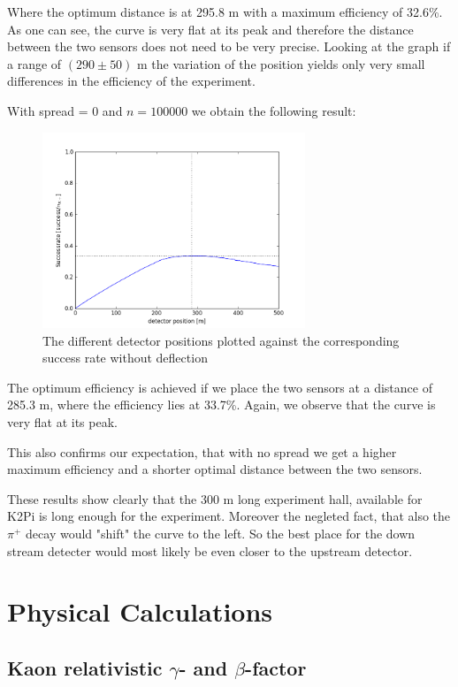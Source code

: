 \documentclass[a4paper,parskip,11pt, DIV12]{scrreprt}
\begin{document}
Where the optimum distance is at 295.8 m with a maximum efficiency of 32.6\%. As one can see, the curve is very flat at its peak and therefore the distance between the two sensors does not need to be very precise. Looking at the graph if a range of $(290 \pm 50)$ m the variation of the position yields only very small differences in the efficiency of the experiment.

With spread = 0 and $n = 100000$ we obtain the following result:

\begin{figure}[h] 
\centering
\includegraphics[width=0.7\textwidth]{Simulation100kNoSpread.png} 
\caption{The different detector positions plotted against the corresponding success rate without deflection}   
\end{figure}

The optimum efficiency is achieved if we place the two sensors at a distance of 285.3 m, where the efficiency lies at 33.7\%. Again, we observe that the curve is very flat at its peak. 

This also confirms our expectation, that with no spread we get a higher maximum efficiency and a shorter optimal distance between the two sensors.

These results show clearly that the 300 m long experiment hall, available for K2Pi is long enough for the experiment. Moreover the negleted fact, that also the $\pi^+$ decay would "shift" the curve to the left. So the best place for the down stream detecter would most likely be even closer to the upstream detector. 

\clearpage

\chapter{Physical Calculations}

\section{Kaon relativistic $\gamma$- and $\beta$-factor} \label{sec:gammabeta}
\end{document}
